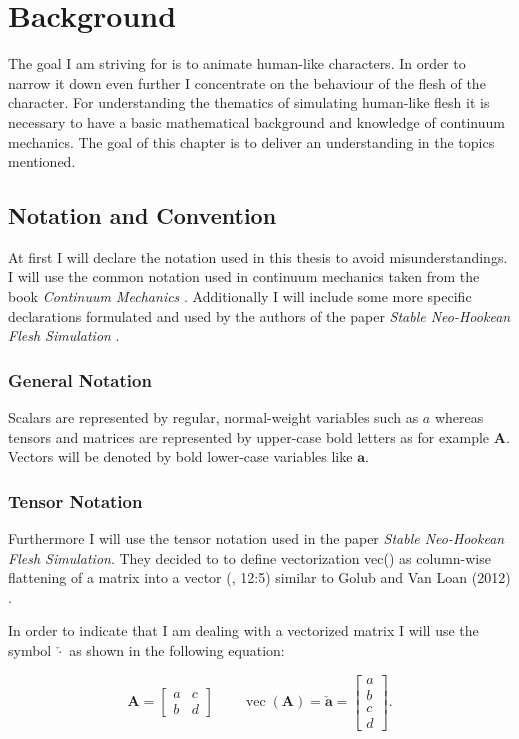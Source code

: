 \chapter{Background} \label{c:Background}
The goal I am striving for is to animate human-like characters. In order to narrow it down even further I concentrate on the behaviour of the flesh of the character. 
For understanding the thematics of simulating human-like flesh it is necessary to have a basic mathematical background and knowledge of continuum mechanics. The goal of this chapter is to deliver an understanding in the topics mentioned.


\section{Notation and Convention}
At first I will declare the notation used in this thesis to avoid misunderstandings. I will use the common notation used in continuum mechanics taken from the book \textit{Continuum Mechanics} \cite{Spencer1980}. Additionally I will include some more specific declarations formulated and used by the authors of the paper \textit{Stable Neo-Hookean Flesh Simulation} \cite{Smith:2018:SNF:3191713.3180491}. 


\subsection{General Notation}
Scalars are represented by regular, normal-weight variables such as $a$ whereas 
tensors and matrices are represented by upper-case bold letters as for example $\textbf{A}$. Vectors will be denoted by bold lower-case variables like $\textbf{a}$. 


\subsection{Tensor Notation}
Furthermore I will use the tensor notation used in the paper \textit{Stable Neo-Hookean Flesh Simulation}. They decided to to define vectorization vec(\cdot) as column-wise flattening of a matrix into a vector (\cite{Smith:2018:SNF:3191713.3180491}, 12:5) similar to Golub and Van Loan (2012) \cite{golub2012matrix}.

In order to indicate that I am dealing with a vectorized matrix I will use the symbol $\check{\cdot}$ as shown in the following equation:

\[
\textbf{A} = \begin{bmatrix} a & c \\ b & d \end{bmatrix} \qquad \operatorname{vec}(\textbf{A}) = \mathbf{\check{a}} = \begin{bmatrix} a \\ b \\ c \\ d \end{bmatrix}.
\]

